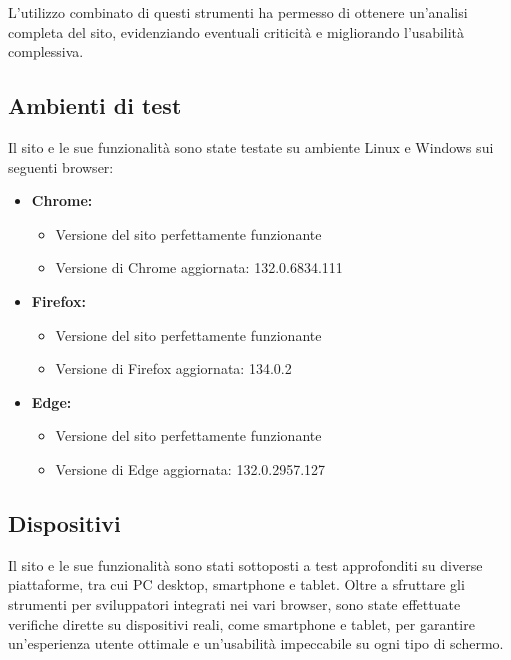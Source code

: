 L'utilizzo combinato di questi strumenti ha permesso di ottenere un'analisi completa del sito, evidenziando eventuali criticità e migliorando l'usabilità complessiva.
\subsection{Ambienti di test}
Il sito e le sue funzionalità sono state testate su ambiente Linux e Windows sui seguenti browser:
\begin{itemize}
    \item \textbf{Chrome:}
        \begin{itemize}
            \item Versione del sito perfettamente funzionante
            \item Versione di Chrome aggiornata: 132.0.6834.111
        \end{itemize}
    \item \textbf{Firefox:}
        \begin{itemize}
            \item Versione del sito perfettamente funzionante
            \item Versione di Firefox aggiornata: 134.0.2
        \end{itemize}
    \item \textbf{Edge:} 
        \begin{itemize}
            \item Versione del sito perfettamente funzionante
            \item Versione di Edge aggiornata: 132.0.2957.127
        \end{itemize}
\end{itemize}
\subsection{Dispositivi}
Il sito e le sue funzionalit\`a sono stati sottoposti a test approfonditi su diverse piattaforme, tra cui PC desktop, smartphone e tablet. Oltre a sfruttare gli strumenti per sviluppatori integrati nei vari browser, sono state effettuate verifiche dirette su dispositivi reali, come smartphone e tablet, per garantire un'esperienza utente ottimale e un'usabilità impeccabile su ogni tipo di schermo.
